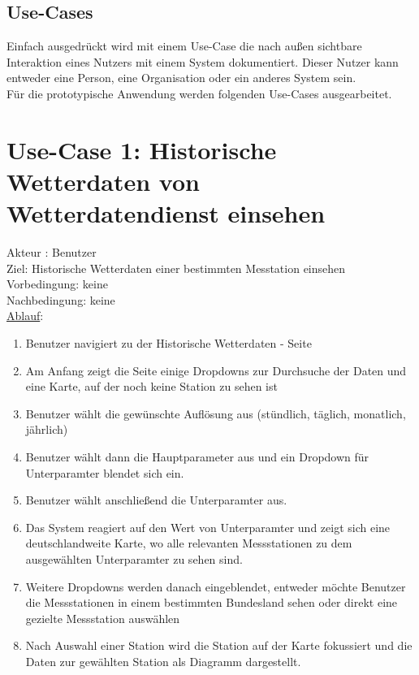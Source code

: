 \documentclass[a4paper,12pt]{scrreprt}
\begin{document}
\subsection{Use-Cases}
Einfach ausgedrückt wird mit einem Use-Case die nach außen sichtbare Interaktion eines Nutzers mit einem System dokumentiert. Dieser Nutzer kann entweder eine Person, eine Organisation oder ein anderes System sein.\\
Für die prototypische Anwendung werden folgenden Use-Cases ausgearbeitet.
\section*{\small \textbf{Use-Case 1: Historische Wetterdaten von Wetterdatendienst einsehen}}
Akteur : Benutzer\\
Ziel: Historische Wetterdaten einer bestimmten Messtation einsehen\\
Vorbedingung: keine\\
Nachbedingung: keine\\
\underline{Ablauf}:
\begin{enumerate}
\item Benutzer navigiert zu der Historische Wetterdaten - Seite
\item Am Anfang zeigt die Seite einige Dropdowns zur Durchsuche der Daten und eine Karte, auf der noch keine Station zu sehen ist
\item Benutzer wählt die gewünschte Auflösung aus (stündlich, täglich, monatlich, jährlich)
\item Benutzer wählt dann die Hauptparameter aus und ein Dropdown für Unterparamter blendet sich ein.
\item Benutzer wählt anschließend die Unterparamter aus.
\item Das System reagiert auf den Wert von Unterparamter und zeigt sich eine deutschlandweite Karte, wo alle relevanten Messstationen zu dem ausgewählten Unterparamter zu sehen sind. 
\item Weitere Dropdowns werden danach eingeblendet, entweder möchte Benutzer die Messstationen in einem bestimmten Bundesland sehen oder direkt eine gezielte Messstation auswählen
\item Nach Auswahl einer Station wird die Station auf der Karte fokussiert und die Daten zur gewählten Station als Diagramm dargestellt. 
\end{enumerate}
\end{document}
